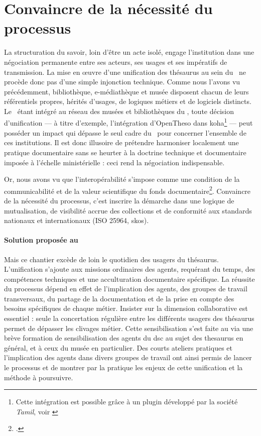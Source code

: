 \section{\label{III-B-1}Convaincre de la nécessité du processus}

La structuration du savoir, loin d’être un acte isolé, engage l’institution dans une négociation permanente entre ses acteurs, ses usages et ses impératifs de transmission. La mise en œuvre d’une unification des thésaurus au sein du \mae~ne procède donc pas d’une simple injonction technique. Comme nous l'avons vu précédemment, bibliothèque, e-médiathèque et musée disposent chacun de leurs référentiels propres, hérités d’usages, de logiques métiers et de logiciels distincts. Le \mae~étant intégré au réseau des musées et bibliothèques du \minarm, toute décision d’unification --- à titre d’exemple, l’intégration d’OpenTheso dans \gls{koha}\footnote{Cette intégration est possible grâce à un plugin développé par la société \textit{Tamil}, voir \cite{PluginTamilOpentheso}} --- peut posséder un impact qui dépasse le seul cadre du \mae~pour concerner l'ensemble de ces institutions. Il est donc illusoire de prétendre harmoniser localement une pratique documentaire sans se heurter à la doctrine technique et documentaire imposée à l’échelle ministérielle : ceci rend la négociation indispensable.

Or, nous avons vu que l’interopérabilité s’impose comme une condition de la communicabilité et de la valeur scientifique du fonds documentaire\footcite{hudonISO25964Pour2012a, maroyeISO25964Distinction2015}. Convaincre de la nécessité du processus, c’est inscrire la démarche dans une logique de mutualisation, de visibilité accrue des collections et de conformité aux standards nationaux et internationaux (ISO 25964, \gls{skos}).

\paragraph*{Solution proposée au \mae}
Mais ce chantier excède de loin le quotidien des usagers du thésaurus. L’unification s’ajoute aux missions ordinaires des agents, requérant du temps, des compétences techniques et une acculturation documentaire spécifique. La réussite du processus dépend en effet de l’implication des agents, des groupes de travail transversaux, du partage de la documentation et de la prise en compte des besoins spécifiques de chaque métier. Insister sur la dimension collaborative est essentiel : seule la concertation régulière entre les différents usagers des thésaurus permet de dépasser les clivages métier. Cette sensibilisation s'est faite au \mae via une brève formation de sensibilisation des agents du \ac{dsc} au sujet des \gls{thesaurus} en général, et à ceux du musée en particulier. Des courts ateliers pratiques et l'implication des agents dans divers groupes de travail ont ainsi permis de lancer le processus et de montrer par la pratique les enjeux de cette unification et la méthode à poursuivre.